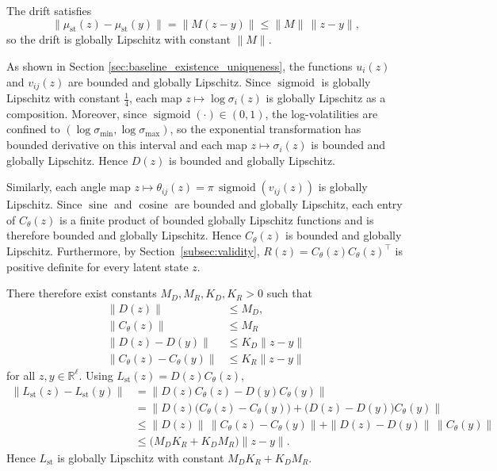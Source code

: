 \begin{description}[
    style=unboxed,
    leftmargin=0pt,
    labelindent=0pt,
    labelsep=0.5em
]

\item[Drift.]
The drift satisfies
\[
\|\mu_{\mathrm{st}}(z)-\mu_{\mathrm{st}}(y)\|
=
\|M(z-y)\|
\leq
\|M\|\,\|z-y\|,
\]
so the drift is globally Lipschitz with constant $\|M\|$.

\item[Diffusion.]

As shown in Section \ref{sec:baseline_existence_uniqueness}, the functions $u_i(z)$ and $v_{ij}(z)$ are bounded and globally Lipschitz. Since $\operatorname{sigmoid}$ is globally Lipschitz with constant $\tfrac{1}{4}$, each map
$z\mapsto\log\sigma_i(z)$ is globally Lipschitz as a composition. Moreover,
since $\operatorname{sigmoid}(\cdot)\in(0,1)$, the log-volatilities are confined
to $(\log\sigma_{\min},\log\sigma_{\max})$, so the exponential transformation
has bounded derivative on this interval and each map $z\mapsto\sigma_i(z)$ is
bounded and globally Lipschitz. Hence $D(z)$ is bounded and globally Lipschitz.

Similarly, each angle map
$z\mapsto\theta_{ij}(z)=\pi\,\operatorname{sigmoid}(v_{ij}(z))$
is globally Lipschitz. Since $\operatorname{sine}$ and $\operatorname{cosine}$ are bounded and globally Lipschitz,
each entry of $C_\theta(z)$ is a finite product of bounded globally Lipschitz
functions and is therefore bounded and globally Lipschitz. Hence $C_\theta(z)$
is bounded and globally Lipschitz. Furthermore, by
Section~\ref{subsec:validity}, $R(z)=C_\theta(z)C_\theta(z)^\top$ is positive
definite for every latent state $z$.

There therefore exist constants $M_D,M_R,K_D,K_R>0$ such that
\begin{align*}
    \|D(z)\|&\leq M_D, \\
    \|C_\theta(z)\|&\leq M_R\\
    \|D(z)-D(y)\|&\leq K_D\|z-y\|\\
    \|C_\theta(z)-C_\theta(y)\|&\leq K_R\|z-y\|
\end{align*}
for all $z,y\in\mathbb{R}^\ell$. Using $L_{\mathrm{st}}(z)=D(z)C_\theta(z)$,
\[
\begin{aligned}
\|L_{\mathrm{st}}(z)-L_{\mathrm{st}}(y)\|
&=
\|D(z)C_\theta(z)-D(y)C_\theta(y)\| \\
&=
\bigl\|
D(z)\bigl(C_\theta(z)-C_\theta(y)\bigr)
+
\bigl(D(z)-D(y)\bigr)C_\theta(y)
\bigr\| \\
&\leq
\|D(z)\|\,\|C_\theta(z)-C_\theta(y)\|
+
\|D(z)-D(y)\|\,\|C_\theta(y)\| \\
&\leq
\bigl(M_DK_R+K_DM_R\bigr)\|z-y\|.
\end{aligned}
\]
Hence $L_{\mathrm{st}}$ is globally Lipschitz with constant $M_DK_R+K_DM_R$.


\end{description}
